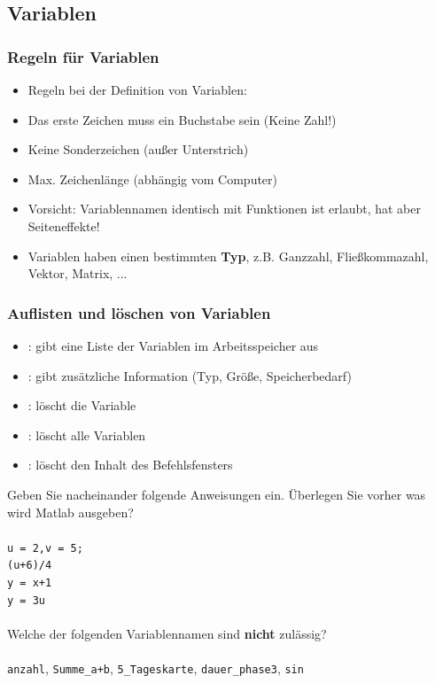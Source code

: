     \subsection{Variablen}
    \begin{frame}
      \frametitle{Regeln für Variablen}
      \begin{itemize}
        \item Regeln bei der Definition von Variablen:
        \item Das erste Zeichen muss ein Buchstabe sein (Keine Zahl!)
        \item Keine Sonderzeichen (außer Unterstrich)
        \item Max. Zeichenlänge (abhängig vom Computer)
        \item \alert{Vorsicht:} Variablennamen identisch mit Funktionen ist erlaubt, hat aber Seiteneffekte!
        \item Variablen haben einen bestimmten \textbf{Typ}, z.B. Ganzzahl, Fließkommazahl, Vektor, Matrix, ...
      \end{itemize}
    \end{frame}

    \begin{frame}
      \frametitle{Auflisten und löschen von Variablen}
      \begin{itemize}
        \item {}: gibt eine Liste der Variablen im Arbeitsspeicher aus
        \item {}: gibt zusätzliche Information (Typ, Größe, Speicherbedarf)
        \item {}: löscht die Variable
        \item {}: löscht alle Variablen
        \item {}: löscht den Inhalt des Befehlsfensters
      \end{itemize}
    \end{frame}

    \secMexercise
    \begin{frame}
      \frameMexercise
      \begin{exercise}
          \sloppy
          Geben Sie nacheinander folgende Anweisungen ein. Überlegen Sie vorher was wird Matlab ausgeben? \\ \\
          \texttt{u = 2,v = 5;} \keys{\return}\\
          \texttt{(u+6)/4} \keys{\return}\\
          \texttt{y = x+1} \keys{\return}\\
          \texttt{y = 3u} \keys{\return}\\ \\
          Welche der folgenden Variablennamen sind \textbf{nicht} zulässig? \\ \\
          \texttt{anzahl}, \texttt{Summe\_a+b}, \texttt{5\_Tageskarte}, \texttt{dauer\_phase3}, \texttt{sin}
      \end{exercise}
    \end{frame}

